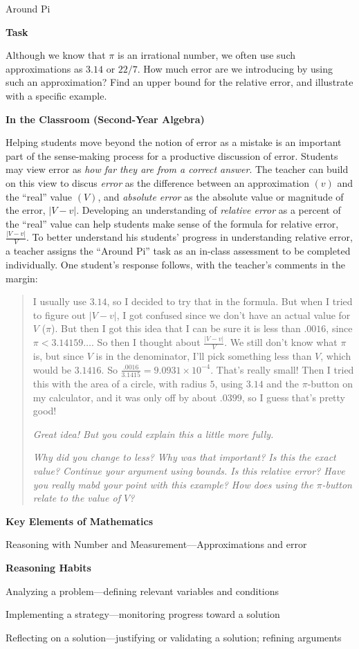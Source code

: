\documentclass[
  10pt,
  a4paper,
  landscape,
  twoside,
  openany
]{scrbook}
\newcounter{example}
\begin{document}
\TriExample
{Around Pi}
{
\noindent
\textbf{Task}

Although we know that $\pi$ is an irrational number, we often use such approximations as $3.14$ or $22/7$. How much error are we introducing by using such an approximation? Find an upper bound for the relative error, and illustrate with a specific example.

\noindent
\textbf{In the Classroom (Second-Year Algebra)}

Helping students move beyond the notion of error as a mistake is an important part of the sense-making process for a productive discussion of error. Students may view error as \emph{how far they are from a correct answer}. The teacher can build on this view to discus \emph{error} as the difference between an approximation $(v)$ and the ``real'' value $(V)$, and \emph{absolute error} as the absolute value or magnitude of the error, $\lvert V - v\rvert$. Developing an understanding of \emph{relative error} as a percent of the ``real'' value can help students make sense of the formula for relative error, $\frac{\lvert V-v\rvert}{V}$. To better understand his students' progress in understanding relative error, a teacher assigns the ``Around Pi'' task as an in-class assessment to be completed individually. One student's response follows, with the teacher's comments in the margin:

\begin{quotation}
  I usually use $3.14$, so I decided to try that in the formula. But when I tried to figure out $\lvert V-v\rvert$, I got confused since we don't have an actual value for $V$ ($\pi$). But then I got this idea that I can be sure it is less than $.0016$, since $\pi<3.14159\dots$. So then I thought about $\frac{\lvert V-v\rvert}{V}$. We still don't know what $\pi$ is, but since $V$ is in the denominator, I'll pick something less than $V$, which would be $3.1416$. So $\frac{.0016}{3.1415}=9.0931\times 10^{-4}$. That's really small! Then I tried this with the area of a circle, with radius $5$, using $3.14$ and the $\pi$-button on my calculator, and it was only off by about $.0399$, so I guess that's pretty good!

  \emph{Great idea! But you could explain this a little more fully.}

  \emph{Why did you change to less? Why was that important? Is this the exact value? Continue your argument using bounds. Is this relative error? Have you really mabd your point with this example? How does using the $\pi$-button relate to the value of $V$?}
\end{quotation}

\noindent
\textbf{Key Elements of Mathematics}

Reasoning with Number and Measurement---Approximations and error


\noindent
\textbf{Reasoning Habits}

Analyzing a problem---defining relevant variables and conditions

Implementing a strategy---monitoring progress toward a solution

Reflecting on a solution---justifying or validating a solution; refining arguments
}
\end{document}
